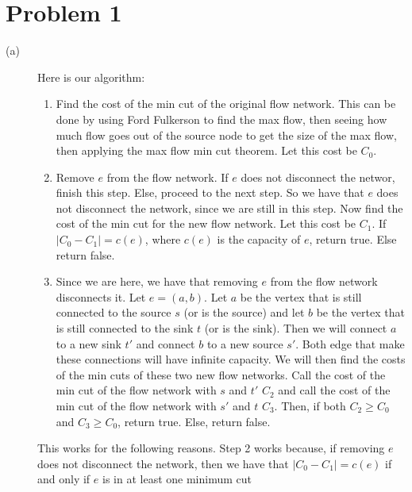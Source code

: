 \documentclass{article}
\begin{document}
\section*{Problem 1}
\begin{description}
    \item[(a)] Here is our algorithm:
        \begin{enumerate}
            \item Find the cost of the min cut of the original flow network.
                This can be done by using Ford Fulkerson to find the max
                flow, then seeing how much flow goes out of the source
                node to get the size of the max flow, then applying the max
                flow min cut theorem. Let this cost be $C_0$.
            \item Remove $e$ from the flow network. If $e$ does not disconnect
                the networ, finish this step. Else, proceed to the next step.
                So we have that $e$ does not disconnect the network, since we
                are still in this step. Now find the cost of the min
                cut for the new flow network. Let this cost be $C_1$.
                 If $|C_0 - C_1| = c(e)$, where $c(e)$ is the capacity of $e$,
                return true. Else return false.
            \item Since we are here, we have that removing $e$ from the flow
                network disconnects it. Let $e = (a, b)$. Let $a$ be the vertex
                that is still connected to the source $s$ (or is the source)
                and let $b$ be the vertex that is still connected to the sink
                $t$ (or is the sink). Then we will connect $a$ to a new sink
                $t'$ and connect $b$ to a new source $s'$. Both edge that make
                these connections will have infinite capacity. We will then find
                the costs of the min cuts of these two new flow networks. Call
                the cost of the min cut of the flow network with $s$ and $t'$
                $C_2$ and call the cost of the min cut of the flow network
                with $s'$ and $t$ $C_3$. Then, if both $C_2 \geq C_0$ and
                $C_3 \geq C_0$, return true. Else, return false.
        \end{enumerate}
        This works for the following reasons. Step 2 works because, if removing
        $e$ does not disconnect the network, then we have that
        $|C_0 - C_1| = c(e)$ if and only if $e$ is in at least one minimum cut

\end{description}
\end{document}
